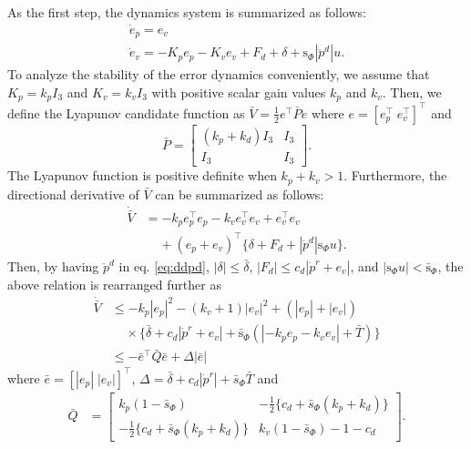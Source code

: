 \documentclass[letterpaper, 10 pt, conference]{ieeeconf}  %
\begin{document}
As the first step, the dynamics system is summarized as follows: 
\begin{equation}
\begin{array}{l}
\dot{e}_p = e_v \\
\dot{e}_v = -K_pe_p-K_ve_v+F_d+\delta+\text{s}_\Phi|\ddot{p}^d| u. 
\end{array} \label{eq:errorDynamics}
\end{equation}
To analyze the stability of the error dynamics conveniently, we assume that $K_p = k_pI_3$ and $K_v = k_vI_3$ with positive scalar gain values $k_p$ and $k_v$. 
Then, we define the Lyapunov candidate function as $\bar{V}=\frac{1}{2}e^\top \bar{P} e$ where $e = [e_p^\top\;e_v^\top]^\top$ and
\begin{equation}
\bar{P} = \left[
\begin{array}{rr}
(k_p+k_d)I_3 & I_3 \\ I_3 & I_3
\end{array}
\right]. \nonumber
\end{equation}
The Lyapunov function is positive definite when $k_p + k_v > 1$.
Furthermore, the directional derivative of $\bar{V}$ can be summarized as follows:
\begin{align}
\dot{\bar{V}} &= -k_p e_p^\top e_p -k_v e_v^\top e_v + e_v^\top e_v \nonumber \\
&\;\;\;\;+(e_p+e_v)^\top\{\delta + F_d + |\ddot{p}^d|\text{s}_\Phi u\}.
\end{align}
Then, by having $\ddot{p}^d$ in eq. \eqref{eq:ddpd}, $|\delta|\leq\bar{\delta}$, $|F_d| \leq c_d|\dot{p}^r+e_v|$, and $|\text{s}_\Phi u| < \bar{\text{s}}_\Phi$, the above relation is rearranged further as
\begin{align}
\dot{\bar{V}} &\leq -k_p|e_p|^2 -(k_v+1)|e_v|^2 +(|e_p| + |e_v|)\nonumber \\
&\;\;\;\;\times\{\bar{\delta} + c_d|\dot{p}^r+e_v|+\bar{\text{s}}_\Phi(|-k_pe_p-k_ve_v|+\bar{T})\} \nonumber \\
&\leq -\bar{e}^\top \bar{Q}\bar{e} + \Delta|\bar{e}| \label{eq:dotV}
\end{align} 
where $\bar{e} = [|e_p|\;|e_v|]^\top$, $\Delta = \bar{\delta}+c_d|\dot{p}^r|+\bar{s}_\Phi\bar{T}$ and
\begin{align}
\bar{Q} &= \left[
\begin{array}{rr}
k_p(1-\bar{s}_\Phi) & -\frac{1}{2}\{c_d+\bar{s}_\Phi(k_p+k_d)\} \\
-\frac{1}{2}\{c_d+\bar{s}_\Phi(k_p+k_d)\} & k_v(1-\bar{s}_\Phi)-1-c_d
\end{array}
\right].\nonumber 
\end{align}
\end{document}
